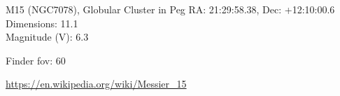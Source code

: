 \begin{block}{M15 (NGC7078), Globular Cluster in Peg}
    RA: 21:29:58.38, Dec: +12:10:00.6 \\ 
    Dimensions: 11.1 \\ 
    Magnitude (V): 6.3



    Finder fov: 60 

    \url{https://en.wikipedia.org/wiki/Messier_15} 
\end{block}